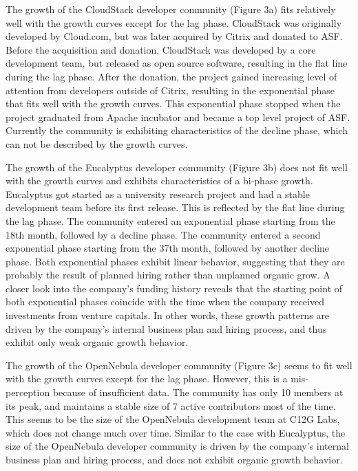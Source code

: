 \documentclass[conference]{IEEEtran}
\begin{document}
The growth of the CloudStack developer community (Figure 3a) fits relatively well with the growth curves except for the lag phase. CloudStack was originally developed by Cloud.com, but was later acquired by Citrix and donated to ASF. Before the acquisition and donation, CloudStack was developed by a core development team, but released as open source software, resulting in the flat line during the lag phase. After the donation, the project gained increasing level of attention from developers outside of Citrix, resulting in the exponential phase that fits well with the growth curves. This exponential phase stopped when the project graduated from Apache incubator and became a top level project of ASF. Currently the community is exhibiting characteristics of the decline phase, which can not be described by the growth curves.

The growth of the Eucalyptus developer community (Figure 3b) does not fit well with the growth curves and exhibits characteristics of a bi-phase growth. Eucalyptus got started as a university research project and had a stable development team before its first release. This is reflected by the flat line during the lag phase. The community entered an exponential phase starting from the 18th month, followed by a decline phase. The community entered a second exponential phase starting from the 37th month, followed by another decline phase. Both exponential phases exhibit linear behavior, suggesting that they are probably the result of planned hiring rather than unplanned organic grow. A closer look into the company's funding history reveals that the starting point of both exponential phases coincide with the time when the company received investments from venture capitals. In other words, these growth patterns are driven by the company’s internal business plan and hiring process, and thus exhibit only weak organic growth behavior.

The growth of the OpenNebula developer community (Figure 3c) seems to fit well with the growth curves except for the lag phase. However, this is a mis-perception because of insufficient data. The community has only 10 members at its peak, and maintains a stable size of 7 active contributors most of the time. This seems to be the size of the OpenNebula development team at C12G Labs, which does not change much over time. Similar to the case with Eucalyptus, the size of the OpenNebula developer community is driven by the company's internal business plan and hiring process, and does not exhibit organic growth behavior.  
\end{document}
